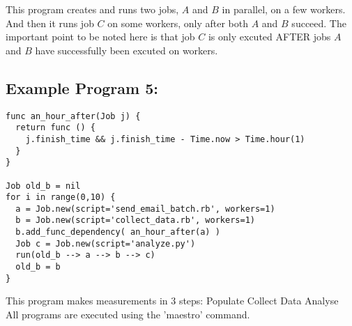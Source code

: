 This program creates and runs two jobs, $A$ and $B$ in parallel, on a few
workers. And then it runs job $C$ on some workers, only after both $A$
and $B$ succeed. The important point to be noted here is that job $C$ is 
only excuted AFTER jobs $A$ and $B$ have successfully been excuted on workers.
\\

\subsection*{Example Program 5:}
\begin{lstlisting}
func an_hour_after(Job j) {
  return func () {
    j.finish_time && j.finish_time - Time.now > Time.hour(1)
  }
}

Job old_b = nil
for i in range(0,10) {
  a = Job.new(script='send_email_batch.rb', workers=1)
  b = Job.new(script='collect_data.rb', workers=1)
  b.add_func_dependency( an_hour_after(a) )
  Job c = Job.new(script='analyze.py')
  run(old_b --> a --> b --> c)
  old_b = b
}
\end{lstlisting}
This program makes measurements in 3 steps:
Populate
Collect Data
Analyse
\\

All programs are executed using the 'maestro' command.
\\
